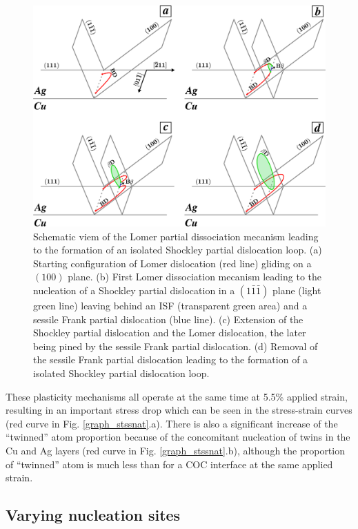 \documentclass[final,3p,times,twocolumn]{elsarticle}
\begin{document}
\begin{figure}[!t]
	\begin{center}
		\includegraphics[width=150mm]{Pic/fig_lomdisso.eps} 
	\end{center}
	\caption{Schematic viem of the Lomer partial dissociation mecanism leading to the formation of an isolated Shockley partial dislocation loop. (a) Starting configuration of Lomer dislocation (red line) gliding on a $(100)$ plane. (b) First Lomer dissociation mecanism leading to the nucleation of a Shockley partial dislocation in a $(1\bar{1}\bar{1})$ plane (light green line) leaving behind an ISF (transparent green area) and a sessile Frank partial dislocation (blue line). (c) Extension of the Shockley partial dislocation and the Lomer dislocation, the later being pined by the sessile Frank partial dislocation. (d) Removal of the sessile Frank partial dislocation leading to the formation of a isolated Shockley partial dislocation loop.}\label{fig_Lomer}
\end{figure} 
 
These plasticity mechanisms all operate at the same time at 5.5\% applied strain, resulting in an important stress drop which can be seen in the stress-strain curves (red curve in Fig. \ref{graph_stssnat}.a). There is also a significant increase of the ``twinned'' atom proportion because of the concomitant nucleation of twins in the Cu and Ag layers (red curve in Fig. \ref{graph_stssnat}.b), although the proportion of ``twinned'' atom is much less than for a COC interface at the same applied strain.
 
 
	\subsection{Varying nucleation sites}\label{subsubpart_comparaison}
	
\end{document}
